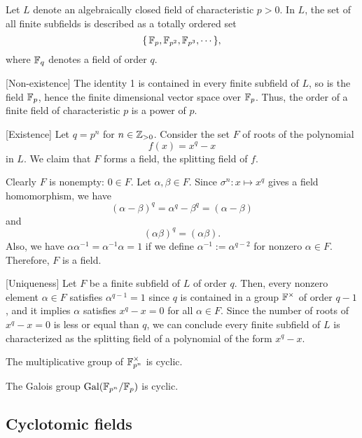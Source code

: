 \documentclass{../exp}
\begin{document}
\begin{thm}
Let $L$ denote an algebraically closed field of characteristic $p>0$.
In $L$, the set of all finite subfields is described as a totally ordered set
\[\{\,\mathbb{F}_p,\mathbb{F}_{p^2},\mathbb{F}_{p^3},\cdots\,\},\]
where $\mathbb{F}_q$ denotes a field of order $q$.
\end{thm}
\begin{pf}
[Non-existence]
The identity 1 is contained in every finite subfield of $L$, so is the field $\mathbb{F}_p$, hence the finite dimensional vector space over $\mathbb{F}_p$.
Thus, the order of a finite field of characteristic $p$ is a power of $p$.

[Existence]
Let $q=p^n$ for $n\in\mathbb{Z}_{>0}$.
Consider the set $F$ of roots of the polynomial
\[f(x)=x^q-x\]
in $L$.
We claim that $F$ forms a field, the splitting field of $f$.

Clearly $F$ is nonempty: $0\in F$.
Let $\alpha,\beta\in F$.
Since $\sigma^n:x\mapsto x^q$ gives a field homomorphism, we have
\[(\alpha-\beta)^q=\alpha^q-\beta^q=(\alpha-\beta)\]
and
\[(\alpha\beta)^q=(\alpha\beta).\]
Also, we have $\alpha\alpha^{-1}=\alpha^{-1}\alpha=1$ if we define $\alpha^{-1}:=\alpha^{q-2}$ for nonzero $\alpha\in F$.
Therefore, $F$ is a field.

[Uniqueness]
Let $F$ be a finite subfield of $L$ of order $q$.
Then, every nonzero element $\alpha\in F$ satisfies $\alpha^{q-1}=1$ since $q$ is contained in a group $\mathbb{F}^\times$ of order $q-1$, and it implies $\alpha$ satisfies $x^q-x=0$ for all $\alpha\in F$.
Since the number of roots of $x^q-x=0$ is less or equal than $q$, we can conclude every finite subfield of $L$ is characterized as the splitting field of a polynomial of the form $x^q-x$.
\end{pf}

\begin{thm}
The multiplicative group of $\mathbb{F}_{p^n}^\times$ is cyclic.
\end{thm}

\begin{thm}
The Galois group $\operatorname{Gal}(\mathbb{F}_{p^n}/\mathbb{F}_p)$ is cyclic.
\end{thm}

\subsection{Cyclotomic fields}
\end{document}
